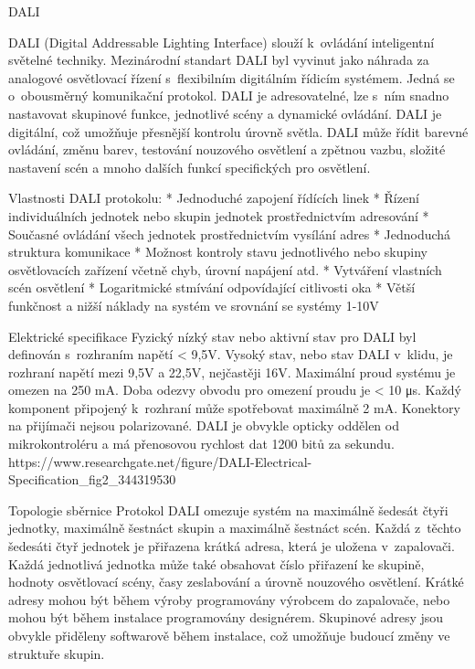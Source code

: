 \chap DALI

DALI (Digital Addressable Lighting Interface) slouží k~ovládání inteligentní světelné techniky.
Mezinárodní standart DALI byl vyvinut jako náhrada za analogové osvětlovací řízení s~flexibilním
digitálním řídicím systémem. Jedná se o~obousměrný komunikační protokol.
DALI je adresovatelné, lze s~ním snadno nastavovat skupinové funkce, jednotlivé scény a dynamické ovládání.
DALI je digitální, což umožňuje přesnější kontrolu úrovně světla.
DALI může řídit barevné ovládání, změnu barev, testování nouzového osvětlení a zpětnou vazbu,
složité nastavení scén a mnoho dalších funkcí specifických pro osvětlení.

\medskip
Vlastnosti DALI protokolu:
\begitems
    * Jednoduché zapojení řídících linek
    * Řízení individuálních jednotek nebo skupin jednotek prostřednictvím adresování
    * Současné ovládání všech jednotek prostřednictvím vysílání adres
    * Jednoduchá struktura komunikace
    * Možnost kontroly stavu jednotlivého nebo skupiny osvětlovacích zařízení včetně chyb, úrovní napájení atd.
    * Vytváření vlastních scén osvětlení
    * Logaritmické stmívání odpovídající citlivosti oka
    * Větší funkčnost a nižší náklady na systém ve srovnání se systémy 1-10V
\enditems

\sec Elektrické specifikace
Fyzický nízký stav nebo aktivní stav pro DALI byl definován s~rozhraním napětí < 9,5V. Vysoký stav, nebo stav
DALI v~klidu, je rozhraní napětí mezi 9,5V a 22,5V, nejčastěji 16V. Maximální proud systému je omezen na 250 mA.
Doba odezvy obvodu pro omezení proudu je < 10 μs. Každý komponent připojený k~rozhraní může spotřebovat maximálně 2 mA.
Konektory na přijímači nejsou polarizované. DALI je obvykle opticky oddělen od mikrokontroléru a má přenosovou
rychlost dat 1200 bitů za sekundu.
\medskip
https://www.researchgate.net/figure/DALI-Electrical-Specification_fig2_344319530
\medskip

\sec Topologie sběrnice
Protokol DALI omezuje systém na maximálně šedesát čtyři jednotky, maximálně šestnáct skupin a maximálně šestnáct scén.
Každá z~těchto šedesáti čtyř jednotek je přiřazena krátká adresa, která je uložena v~zapalovači.
Každá jednotlivá jednotka může také obsahovat číslo přiřazení ke skupině, hodnoty osvětlovací scény,
časy zeslabování a úrovně nouzového osvětlení. Krátké adresy mohou být během výroby programovány výrobcem
do zapalovače, nebo mohou být během instalace programovány designérem. Skupinové adresy jsou obvykle
přiděleny softwarově během instalace, což umožňuje budoucí změny ve struktuře skupin.

